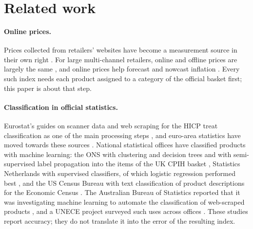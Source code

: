 \section{Related work}\label{sec:related}

\paragraph{Online prices.} Prices collected from retailers' websites have become a
measurement source in their own right \citep{cavallo2016bpp}. For large multi-channel
retailers, online and offline prices are largely the same \citep{cavallo2017online}, and
online prices help forecast and nowcast inflation \citep{aparicio2020forecasting,
macias2023nowcasting}. Every such index needs each product assigned to a category of the
official basket first; this paper is about that step.

\paragraph{Classification in official statistics.} Eurostat's guides on scanner data and
web scraping for the HICP treat classification as one of the main processing steps
\citep{eurostat2017scanner, eurostat2020webscraping}, and euro-area statistics have moved
towards these sources \citep{eiglsperger2019hicp}. National statistical offices have
classified products with machine learning: the ONS with clustering and decision trees
\citep{metcalfe2016clip} and with semi-supervised label propagation into the items of the
UK CPIH basket \citep{martindale2020semi}, Statistics Netherlands with supervised classifiers, of which
logistic regression performed best \citep{harms2019cbs}, and the US Census Bureau with
text classification of product descriptions for the Economic Census
\citep{roberson2021applying}. The Australian Bureau of Statistics reported that it was
investigating machine learning to automate the classification of web-scraped products
\citep{abs2020webscraping}, and a UNECE project surveyed such uses across offices
\citep{unece2021ml}. These studies report accuracy; they do not translate it into the
error of the resulting index.

